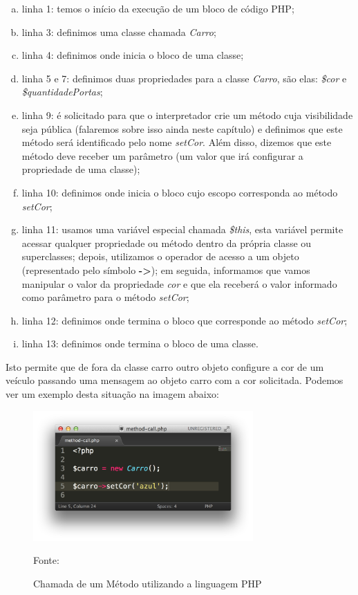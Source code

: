 \begin{enumerate}[a)]
    \item linha 1: temos o início da execução de um bloco de código PHP;
    \item linha 3: definimos uma classe chamada \textit{Carro};
    \item linha 4: definimos onde inicia o bloco de uma classe;
    \item linha 5 e 7: definimos duas propriedades para a classe
    \textit{Carro}, são elas: \textit{\$cor} e \textit{\$quantidadePortas};
    \item linha 9: é solicitado para que o interpretador crie um método
    cuja visibilidade seja pública (falaremos sobre isso ainda neste capítulo) 
    e definimos que este método será identificado pelo nome \textit{setCor}.
    Além disso, dizemos que este método deve receber um parâmetro (um valor 
    que  irá configurar a propriedade de uma classe);
    \item linha 10: definimos onde inicia o bloco cujo escopo
    corresponda ao método \textit{setCor};
    \item linha 11: usamos uma variável especial chamada
    \textit{\$this}, esta variável permite acessar qualquer propriedade ou
    método dentro da própria classe ou superclasses; depois, utilizamos o 
    operador de acesso a um objeto (representado pelo símbolo \textbf{->}); em
    seguida, informamos que vamos manipular o valor da propriedade \textit{cor}
    e que ela receberá o valor informado como parâmetro para o método \textit{setCor};
    \item linha 12: definimos onde termina o bloco que corresponde ao
    método \textit{setCor};
    \item linha 13: definimos onde termina o bloco de uma classe.
\end{enumerate}
				
Isto permite que de fora da classe carro outro objeto configure a cor de um
veículo passando uma mensagem ao objeto carro com a cor solicitada. Podemos ver 
um exemplo desta situação na imagem abaixo:


\begin{figure}[h!tb]
	\caption{Chamada de um Método utilizando a linguagem PHP}
	\label{fig:chamadaMetodo}
	
	\centering
	\includegraphics[width=0.75\textwidth]{images/method-call.png}
	
	\centering
	\footnotesize Fonte: \fonteOAutor
\end{figure}

